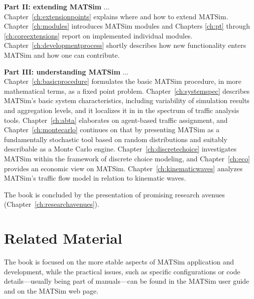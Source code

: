 \textbf{Part II: extending MATSim} ... \\
Chapter~\ref{ch:extensionpoints} explains where and how to extend MATSim. Chapter~\ref{ch:modules} introduces MATSim modules and Chapters \ref{ch:pt} through \ref{ch:coreextensions} report on implemented individual modules. Chapter~\ref{ch:developmentprocess} shortly describes how new functionality enters MATSim and how one can contribute.

\textbf{Part III: understanding MATSim} ... \\
Chapter~\ref{ch:basicprocedure} formulates the basic MATSim procedure, in more mathematical terms, as a fixed point problem. Chapter~\ref{ch:systemspec} describes MATSim's basic system characteristics, including variability of simulation results and aggregation levels, and it localizes it in in the spectrum of traffic analysis tools. Chapter~\ref{ch:abta} elaborates on agent-based traffic assignment, and Chapter~\ref{ch:montecarlo} continues on that by presenting MATSim as a fundamentally stochastic tool based on random distributions and suitably describable as a Monte Carlo engine. Chapter~\ref{ch:discretechoice} investigates MATSim within the framework of discrete choice modeling, and Chapter~\ref{ch:eco} provides an economic view on MATSim. Chapter~\ref{ch:kinematicwaves} analyzes MATSim's traffic flow model in relation to kinematic waves.

The book is concluded by the presentation of promising research avenues (Chapter~\ref{ch:researchavenues}).

\section*{Related Material}
The book is focused on the more stable aspects of MATSim application and development, while the practical issues, such as specific configurations or code details---usually being part of manuals---can be found in the MATSim user guide \citep[][]{MATSim_Userguide_2014} and on the MATSim web page.

%
%
